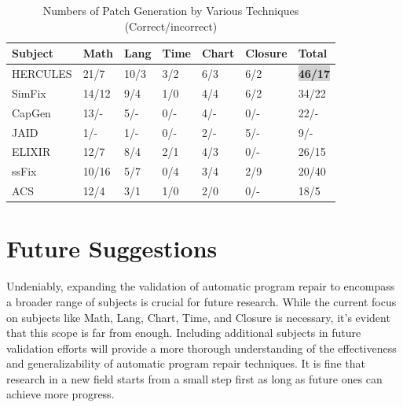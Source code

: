 \documentclass[runningheads]{llncs}
\begin{document}
\begin{table}
\centering
\caption{Numbers of Patch Generation by Various Techniques (Correct/incorrect)}\label{tab1}
\begin{tabular}{l l l l l l l}
\hline
{\bfseries Subject} &  {\bfseries Math} & {\bfseries Lang} & {\bfseries Time} & {\bfseries Chart} & {\bfseries Closure} & {\bfseries Total}\\
\hline
HERCULES &  21/7 & 10/3 & 3/2 & 6/3 & 6/2 & \colorbox{lightgray} {\bfseries46/17}\\
SimFix &  14/12 & 9/4 & 1/0 & 4/4 & 6/2 & 34/22\\
CapGen &  13/- & 5/- & 0/- & 4/- & 0/- & 22/-\\
JAID &  1/- & 1/- & 0/- & 2/- & 5/- & 9/-\\
ELIXIR &  12/7 & 8/4 & 2/1 & 4/3 & 0/- & 26/15\\
ssFix &  10/16 & 5/7 & 0/4 & 3/4 & 2/9 & 20/40\\
ACS &  12/4 & 3/1 & 1/0 & 2/0 & 0/- & 18/5\\
\hline
\end{tabular}
\end{table}

\section{Future Suggestions}
Undeniably, expanding the validation of automatic program repair to encompass a broader range of subjects is crucial for future research. While the current focus on subjects like Math, Lang, Chart, Time, and Closure is necessary, it's evident that this scope is far from enough. Including additional subjects in future validation efforts will provide a more thorough understanding of the effectiveness and generalizability of automatic program repair techniques. It is fine that research in a new field starts from a small step first as long as future ones can achieve more progress. 
\end{document}
